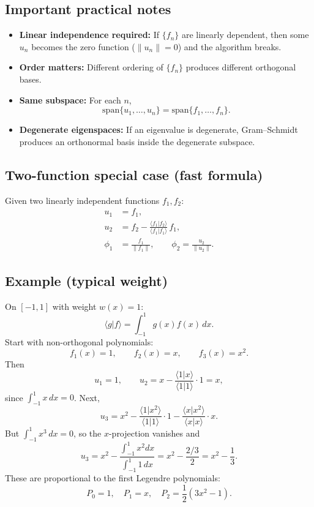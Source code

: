 
\subsection{Important practical notes}
\begin{itemize}
\item \textbf{Linear independence required:}
If $\{f_n\}$ are linearly dependent, then some $u_n$ becomes the zero function
($\|u_n\|=0$) and the algorithm breaks.
\item \textbf{Order matters:}
Different ordering of $\{f_n\}$ produces different orthogonal bases.
\item \textbf{Same subspace:}
For each $n$,
\[
\mathrm{span}\{u_1,\dots,u_n\} = \mathrm{span}\{f_1,\dots,f_n\}.
\]
\item \textbf{Degenerate eigenspaces:}
If an eigenvalue is degenerate, Gram--Schmidt produces an orthonormal basis
inside the degenerate subspace.
\end{itemize}


\subsection{Two-function special case (fast formula)}
Given two linearly independent functions $f_1,f_2$:
\begin{align}
u_1 &= f_1,\\
u_2 &= f_2 - \frac{\langle f_1|f_2\rangle}{\langle f_1|f_1\rangle}\,f_1,\\
\phi_1 &= \frac{f_1}{\|f_1\|},\qquad
\phi_2 = \frac{u_2}{\|u_2\|}.
\end{align}


\subsection{Example (typical weight)}
On $[-1,1]$ with weight $w(x)=1$:
\[
\langle g|f\rangle = \int_{-1}^{1} g(x)f(x)\,dx.
\]
Start with non-orthogonal polynomials:
\[
f_1(x)=1,\qquad f_2(x)=x,\qquad f_3(x)=x^2.
\]
Then
\[
u_1=1,
\qquad
u_2=x-\frac{\langle 1|x\rangle}{\langle 1|1\rangle}\cdot 1
= x,
\]
since $\int_{-1}^1 x\,dx=0$.
Next,
\[
u_3 = x^2 - \frac{\langle 1|x^2\rangle}{\langle 1|1\rangle}\cdot 1
      - \frac{\langle x|x^2\rangle}{\langle x|x\rangle}\cdot x.
\]
But $\int_{-1}^1 x^3\,dx=0$, so the $x$-projection vanishes and
\[
u_3 = x^2 - \frac{\int_{-1}^1 x^2 dx}{\int_{-1}^1 1\,dx}
= x^2 - \frac{2/3}{2}
= x^2 - \frac{1}{3}.
\]
These are proportional to the first Legendre polynomials:
\[
P_0=1,\quad P_1=x,\quad P_2=\frac{1}{2}(3x^2-1).
\]

